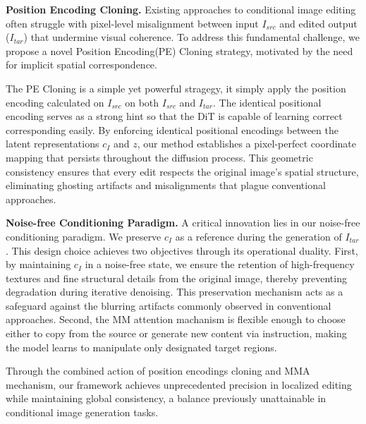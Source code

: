 
\noindent \textbf{Position Encoding Cloning.}
Existing approaches to conditional image editing often struggle with pixel-level misalignment between input $I_{src}$ and edited output ($I_{tar}$) that undermine visual coherence. To address this fundamental challenge, we propose a novel Position Encoding(PE) Cloning strategy, motivated by the need for implicit spatial correspondence. 

The PE Cloning is a simple yet powerful stragegy, it simply apply the position encoding calculated on $I_{src}$ on both $I_{src}$ and $I_{tar}$. The identical positional encoding serves as a strong hint so that the DiT is capable of learning correct corresponding easily. By enforcing identical positional encodings between the latent representations $c_I$ and $z$, our method establishes a pixel-perfect coordinate mapping that persists throughout the diffusion process. 
This geometric consistency ensures that every edit respects the original image's spatial structure, eliminating ghosting artifacts and misalignments that plague conventional approaches.

\noindent \textbf{Noise-free Conditioning Paradigm.}  
A critical innovation lies in our noise-free conditioning paradigm. We preserve $c_I$ as a reference during the generation of $I_{tar}$. This design choice achieves two objectives through its operational duality.  
First, by maintaining $c_I$ in a noise-free state, we ensure the retention of high-frequency textures and fine structural details from the original image, thereby preventing degradation during iterative denoising. This preservation mechanism acts as a safeguard against the blurring artifacts commonly observed in conventional approaches. Second, the MM attention machanism is flexible enough to choose either to copy from the source or generate new content via instruction, making the model learns to manipulate only designated target regions.  

Through the combined action of position encodings cloning and MMA mechanism, our framework achieves unprecedented precision in localized editing while maintaining global consistency, a balance previously unattainable in conditional image generation tasks.

